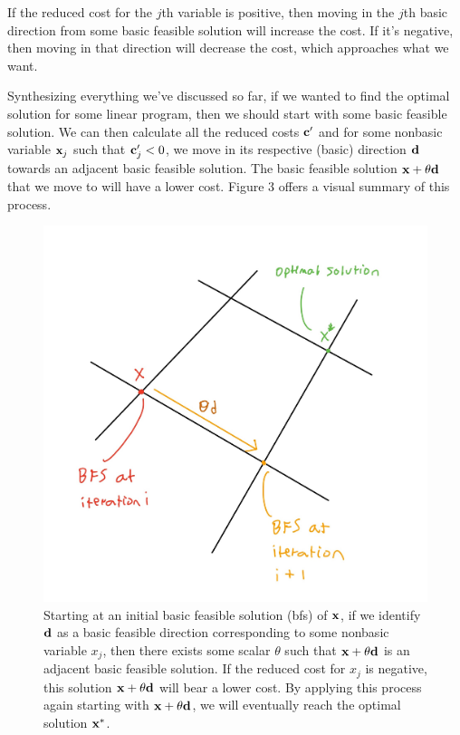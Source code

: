 \documentclass{paper}
\begin{document}
\bigskip
If the reduced cost for the $j$th variable is positive, then moving in the $j$th basic direction from some basic feasible solution will increase the cost. If it's negative, then moving in that direction will decrease the cost, which approaches what we want.

\medskip
Synthesizing everything we've discussed so far, if we wanted to find the optimal solution for some linear program, then we should start with some basic feasible solution. We can then calculate all the reduced costs $\bold{c}'$ and for some nonbasic variable $\bold{x}_j$ such that $\bold{c}_j' < 0$, we move in its respective (basic) direction $\bold{d}$ towards an adjacent basic feasible solution. The basic feasible solution $\bold{x} + \theta\bold{d}$ that we move to will have a lower cost. Figure 3 offers a visual summary of this process.

\begin{figure}
    \centering
    \includegraphics[scale=0.1]{figure 3.jpg}
    \caption{Starting at an initial basic feasible solution (bfs) of $\bold{x}$, if we identify $\bold{d}$ as a basic feasible direction corresponding to some nonbasic variable $x_j$, then there exists some scalar $\theta$ such that $\bold{x} + \theta \bold{d}$ is an adjacent basic feasible solution. If the reduced cost for $x_j$ is negative, this solution $\bold{x} + \theta \bold{d}$ will bear a lower cost. By applying this process again starting with $\bold{x} + \theta \bold{d}$, we will eventually reach the optimal solution $\bold{x}^*$.}
    \label{fig:my_label}
\end{figure}
\end{document}
